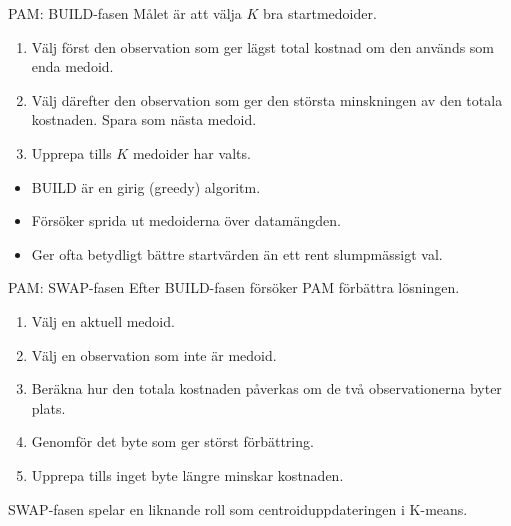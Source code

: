 \documentclass[10pt,english]{beamer}
\begin{document}
\begin{frame}{PAM: BUILD-fasen}
    Målet är att välja $K$ bra startmedoider.

    \begin{enumerate}
        \item Välj först den observation som ger lägst total kostnad
              om den används som enda medoid.

        \item Välj därefter den observation som ger den största
              minskningen av den totala kostnaden. Spara som nästa medoid.

        \item Upprepa tills $K$ medoider har valts.
    \end{enumerate}

    \vspace{0.2cm}

    \begin{itemize}
        \item BUILD är en girig (greedy) algoritm.
        \item Försöker sprida ut medoiderna över datamängden.
        \item Ger ofta betydligt bättre startvärden än ett rent slumpmässigt val.
    \end{itemize}
\end{frame}

\begin{frame}{PAM: SWAP-fasen}
    Efter BUILD-fasen försöker PAM förbättra lösningen.

    \begin{enumerate}
        \item Välj en aktuell medoid.

        \item Välj en observation som inte är medoid.

        \item Beräkna hur den totala kostnaden påverkas om
              de två observationerna byter plats.

        \item Genomför det byte som ger störst förbättring.

        \item Upprepa tills inget byte längre minskar kostnaden.
    \end{enumerate}

    \vspace{0.2cm}

    \begin{greenbox}
        SWAP-fasen spelar en liknande roll som centroiduppdateringen
        i K-means.
    \end{greenbox}
\end{frame}
\end{document}
